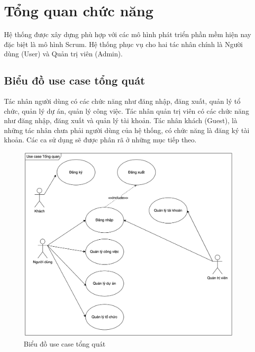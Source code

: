 \documentclass[../DoAn.tex]{subfiles}
\begin{document}
\section{Tổng quan chức năng}
\label{section:2.2}
Hệ thống được xây dựng phù hợp với các mô hình phát triển phần mềm hiện nay đặc biệt là mô hình Scrum.
Hệ thống phục vụ cho hai tác nhân chính là Người dùng (User) và Quản trị viên (Admin).

\subsection{Biểu đồ use case tổng quát}
\label{subsection:2.2.1}
Tác nhân người dùng có các chức năng như đăng nhập, đăng xuất, quản lý tổ chức, quản lý dự án, quản lý công việc. Tác nhân quản trị viên có các chức năng như đăng nhập,
đăng xuất và quản lý tài khoản. Tác nhân khách (Guest), là những tác nhân chưa phải người dùng của hệ thống, có chức năng là đăng ký tài khoản.
Các ca sử dụng sẽ được phân rã ở những mục tiếp theo.
\begin{figure}[H]
    \centering
    \includegraphics[width=1.0\linewidth]{Hinhve/GeneralUseCases.png}
    \caption{Biểu đồ use case tổng quát}
    \label{fig:GeneralUseCases}
\end{figure}
\newpage

\end{document}

